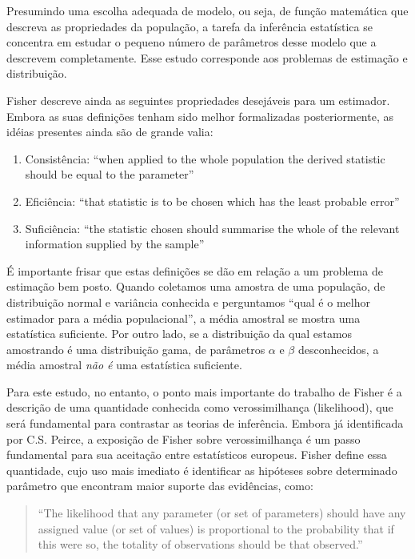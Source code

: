 Presumindo uma escolha adequada de modelo, ou seja,	de função matemática que descreva as propriedades da população,
a tarefa da inferência estatística se concentra em estudar o pequeno número de parâmetros desse modelo que a descrevem
completamente. Esse estudo corresponde aos problemas de estimação e distribuição.

Fisher descreve ainda as seguintes propriedades desejáveis para um estimador. Embora as suas definições tenham sido
melhor formalizadas posteriormente, as idéias presentes ainda são de grande valia:
\begin{enumerate}
	\item Consistência: ``when applied to the whole population the derived statistic should be equal to the parameter''
	\item Eficiência: ``that statistic is to be chosen which has the least probable error''
	\item Suficiência: ``the statistic chosen should summarise the whole of the relevant information supplied by the sample''
\end{enumerate}

É importante frisar que estas definições se dão em relação a um problema de estimação bem posto. Quando coletamos
uma amostra de uma população, de distribuição normal e variância conhecida e perguntamos ``qual é o melhor estimador para a média populacional'', 
a média amostral se mostra uma estatística suficiente. Por outro lado, se a distribuição da qual estamos amostrando
é uma distribuição gama, de parâmetros $\alpha$ e $\beta$ desconhecidos, a média amostral {\em não é} uma estatística
suficiente.

Para este estudo, no entanto, o ponto mais importante do trabalho de Fisher é a descrição de uma quantidade conhecida como
verossimilhança (likelihood), que será fundamental para contrastar as teorias de inferência. Embora já identificada por C.S.
Peirce, a exposição de Fisher sobre verossimilhança é um passo fundamental para sua aceitação entre estatísticos europeus.
Fisher define essa quantidade,
cujo uso mais imediato é identificar as hipóteses sobre determinado parâmetro que encontram maior suporte das evidências,
como:

\begin{quote}
``The likelihood that any parameter (or set of parameters) should have
any assigned value (or set of values) is proportional to the probability
that if this were so, the totality of observations should be that observed.''\citep{Fisher1922}
\end{quote}

